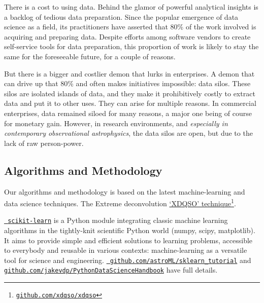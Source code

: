 \documentclass[oneside, a4paper, onecolumn, 11pt]{article}
\begin{document}
\noindent
There is a cost to using data. Behind the glamor of powerful
analytical insights is a backlog of tedious data preparation. Since
the popular emergence of data science as a field, its practitioners
have asserted that 80\% of the work involved is acquiring and
preparing data. Despite efforts among software vendors to create
self-service tools for data preparation, this proportion of work is
likely to stay the same for the foreseeable future, for a couple of
reasons.

\noindent
But there is a bigger and costlier demon that lurks in enterprises. A
demon that can drive up that 80\% and often makes initiatives
impossible: data silos. These silos are isolated islands of data, and
they make it prohibitively costly to extract data and put it to other
uses. They can arise for multiple reasons.
In commercial enterprises, data remained siloed for many reasons, a
major one being of course for monetary gain.  However, in research
environments, and {\it especially in contemporary observational
astrophysics}, the data silos are open, but due to the lack of raw
person-power. 


\subsection*{Algorithms and Methodology}
Our algorithms and methodology is based on the latest machine-learning and data science techniques. 
The Extreme deconvolution \href{http://www.sdss.org/dr14/data\_access/value-added-catalogs/?vac\_id=xdqso/}{`XDQSO' technique}\footnote{\href{https://github.com/xdqso/xdqso}{\tt github.com/xdqso/xdqso}}.

\noindent
\href{http://ogrisel.github.io/scikit-learn.org/sklearn-tutorial/index.html}{\tt
scikit-learn} is a Python module integrating classic machine learning
algorithms in the tightly-knit scientific Python world (numpy, scipy,
matplotlib). It aims to provide simple and efficient solutions to
learning problems, accessible to everybody and reusable in various
contexts: machine-learning as a versatile tool for science and
engineering.  \href{https://github.com/astroML/sklearn\_tutorial}{{\tt
github.com/astroML/sklearn\_tutorial}} and \href{https://github.com/jakevdp/PythonDataScienceHandbook}{{\tt github.com/jakevdp/PythonDataScienceHandbook}} have full details.

\end{document}

